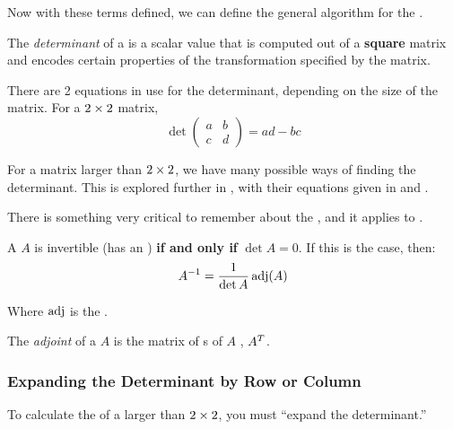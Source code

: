 Now with these terms defined, we can define the general algorithm for the .

\begin{definition}[Determinant]\label{def:Determinant}
  The \emph{determinant} of a  is a scalar value that is computed out of a \textbf{square} matrix and encodes certain properties of the transformation specified by the matrix.

  There are 2 equations in use for the determinant, depending on the size of the matrix.
  For a $2 \times 2$ matrix,
  \begin{equation}\label{eq:Determinant_2x2}
    \det
    \begin{pmatrix}
      a & b \\
      c & d
    \end{pmatrix}
    = ad - bc
  \end{equation}

  For a matrix larger than $2 \times 2$, we have many possible ways of finding the determinant.
  This is explored further in , with their equations given in  and .
\end{definition}

There is something very critical to remember about the , and it applies to .
\begin{theorem}\label{thm:Determinant_Invertible_Matrix}
  A  $A$ is invertible (has an ) \textbf{if and only if} $\det A = 0$.
  If this is the case, then:
  \begin{equation}\label{eq:Inverse_by_Determinant}
    A^{-1} = \frac{1}{\det A} \operatorname{adj}(A)
  \end{equation}

  Where $\operatorname{adj}$ is the .
\end{theorem}

\begin{definition}[Adjoint]\label{def:Adjoint}
  The \emph{adjoint} of a  $A$ is the matrix of s of $A$ , ${A}^{T}$.
\end{definition}

\subsubsection{Expanding the Determinant by Row or Column}\label{subsubsec:Expand_Determinant}
To calculate the  of a  larger than $2 \times 2$, you must ``expand the determinant.''

